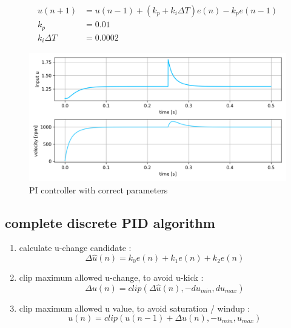 \documentclass[12pt,twoside,onecolumn,openany,extrafontsizes,dvipsnames]{memoir}
\begin{document}
                \begin{align}
                    u(n+1) &= u(n-1) + (k_p + k_i\Delta T) e(n) - k_pe(n-1) \\
                    k_p    &= 0.01 \\
                    k_i\Delta T    &= 0.0002
                \end{align}

                \begin{figure}[!htb]
                    \centering
                    \includegraphics[scale=0.8]{../images/motor_control/pid_pi_control_1.png}
                    \caption{PI controller with correct parameters}
                    \label{fig:pi_controller_correct}
                \end{figure}
                
            \newpage
            \subsection{complete discrete PID algorithm}  
    
                \begin{enumerate}
                  \item  calculate u-change candidate :
                    $$\Delta \hat{u}(n) = k_0e(n) + k_1e(n) + k_2e(n)$$
                  
                  \item clip maximum allowed u-change, to avoid u-kick :
                    $$\Delta u(n) = clip(\Delta \hat{u}(n), -du_{min}, du_{max})$$
              
                  \item clip maximum allowed u value, to avoid saturation / windup :
                    $$u(n) = clip(u(n-1) + \Delta u(n), -u_{min}, u_{max})$$
                \end{enumerate}
\end{document}
